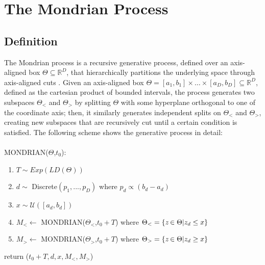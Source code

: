 \documentclass[a4paper]{article}
\begin{document}
\section{The Mondrian Process}

\subsection{Definition}\label{defMP}

The Mondrian process is a recursive generative process, defined over an axis-aligned box $\Theta \subseteq \mathbb{R}^D$, that hierarchically partitions the underlying space through axis-aligned cuts \cite{2008MondrianProcess}. %
Given an axis-aligned box $\Theta = [a_1,b_1] \times \ldots \times [a_D,b_D] \subseteq \mathbb{R}^D$, defined as the cartesian product of bounded intervals, the process generates two subspaces $\Theta_<$ and $\Theta_>$ by splitting $\Theta$ with some hyperplane orthogonal to one of the coordinate axis; 
then, it similarly generates independent splits on $\Theta_<$ and $\Theta_>$, creating new subspaces that are recursively cut until a certain condition is satisfied.
The following scheme shows the generative process in detail:\\ \\
MONDRIAN($\Theta$,$t_0$):
\begin{enumerate}[nolistsep]
\item $T \sim Exp(LD(\Theta))$ 
\item $d \sim$ Discrete$(p_1,...,p_D)$ where $p_d \propto (b_d-a_d)$
\item $x \sim \mathcal{U}([a_d,b_d])$
\item $M_< \leftarrow$ MONDRIAN($\Theta_<$,$t_0+T$) where $\Theta_< = \{\emph{z} \in \Theta \lvert z_d \leq x \}$ 
\item $M_> \leftarrow$ MONDRIAN($\Theta_>$,$t_0+T$) where $\Theta_> = \{\emph{z} \in \Theta \lvert z_d \geq x \}$ 
\end{enumerate}
return ($t_0+T,d,x,M_<,M_>$)\\ \\%
\end{document}
